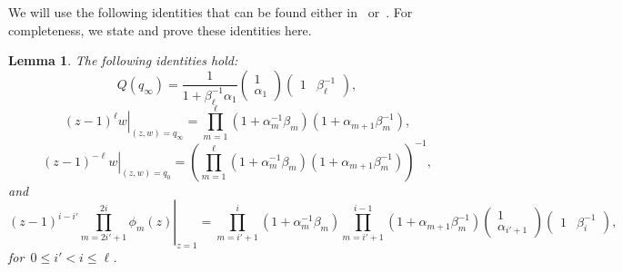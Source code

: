 \documentclass[11pt]{article}
\theoremstyle{plain}
\newtheorem{lemma}[theorem]{Lemma}
\theoremstyle{definition}
\numberwithin{equation}{section}
\begin{document}
We will use the following identities that can be found either in~\cite{Ber21} or~\cite{BNR25}. For completeness, we state and prove these identities here. 
%
\begin{lemma}\label{lem:at_1}
The following identities hold:
\begin{equation}\label{eq:at_1_1}
Q(q_\infty)=\frac{1}{1+\beta_\ell^{-1} \alpha_1}
\begin{pmatrix}
1 \\
\alpha_1
\end{pmatrix}
\begin{pmatrix}
1 & \beta_\ell^{-1}
\end{pmatrix},
\end{equation}
\begin{equation}\label{eq:at_1_2}
\left.(z-1)^\ell w\right|_{(z,w)=q_{\infty}}=\prod_{m=1}^\ell(1+\alpha_m^{-1}\beta_m)(1+\alpha_{m+1}\beta_m^{-1}),
\end{equation}
\begin{equation}\label{eq:at_1_2_q0}
\left.(z-1)^{-\ell} w\right|_{(z,w)=q_{0}}=\left(\prod_{m=1}^\ell(1+\alpha_m^{-1}\beta_m)(1+\alpha_{m+1}\beta_m^{-1})\right)^{-1},
\end{equation}
and
\begin{equation}\label{eq:at_1_3}
\left.(z-1)^{i-i'}\prod_{m=2i'+1}^{2i}\phi_m(z)\right|_{z=1}
=\prod_{m=i'+1}^i(1+\alpha_m^{-1}\beta_m)\prod_{m=i'+1}^{i-1}(1+\alpha_{m+1}\beta_m^{-1})
\begin{pmatrix}
1 \\
\alpha_{i'+1}
\end{pmatrix}
\begin{pmatrix}
1 & \beta_i^{-1}
\end{pmatrix},
\end{equation}
for~$0\leq i'<i\leq \ell$.
\end{lemma}
\end{document}
